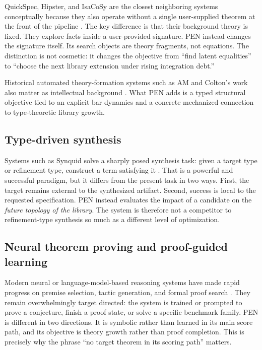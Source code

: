 \documentclass[pdflatex,sn-mathphys,Numbered]{sn-jnl}
\theoremstyle{thmstyleone}
\theoremstyle{thmstylethree}
\theoremstyle{thmstyletwo}
\begin{document}
QuickSpec, Hipster, and IsaCoSy are the closest neighboring systems conceptually because they also operate without a single user-supplied theorem at the front of the pipeline \cite{quickspec,isacosy,hipster}. The key difference is that their background theory is fixed. They explore facts inside a user-provided signature. PEN instead changes the signature itself. Its search objects are theory fragments, not equations. The distinction is not cosmetic: it changes the objective from ``find latent equalities'' to ``choose the next library extension under rising integration debt.''

Historical automated theory-formation systems such as AM and Colton's work also matter as intellectual background \cite{lenat,colton}. What PEN adds is a typed structural objective tied to an explicit bar dynamics and a concrete mechanized connection to type-theoretic library growth.

\subsection{Type-driven synthesis}

Systems such as Synquid solve a sharply posed synthesis task: given a target type or refinement type, construct a term satisfying it \cite{synquid}. That is a powerful and successful paradigm, but it differs from the present task in two ways. First, the target remains external to the synthesized artifact. Second, success is local to the requested specification. PEN instead evaluates the impact of a candidate on the \emph{future topology of the library}. The system is therefore not a competitor to refinement-type synthesis so much as a different level of optimization.

\subsection{Neural theorem proving and proof-guided learning}

Modern neural or language-model-based reasoning systems have made rapid progress on premise selection, tactic generation, and formal proof search \cite{leandojo,alphageometry}. They remain overwhelmingly target directed: the system is trained or prompted to prove a conjecture, finish a proof state, or solve a specific benchmark family. PEN is different in two directions. It is symbolic rather than learned in its main score path, and its objective is theory growth rather than proof completion. This is precisely why the phrase ``no target theorem in its scoring path'' matters.
\end{document}
